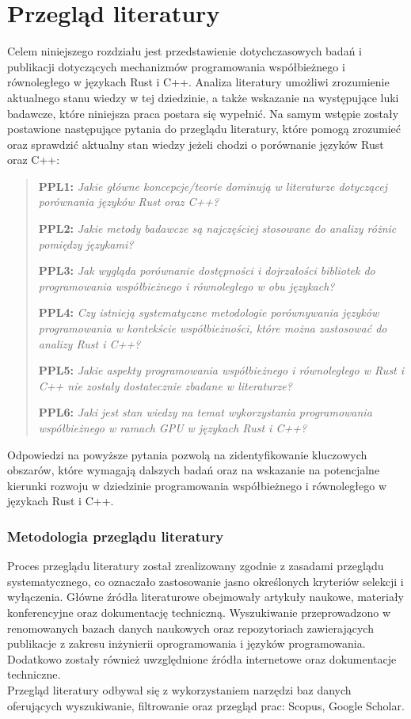 \chapter{Przegląd literatury}
Celem niniejszego rozdziału jest przedstawienie dotychczasowych badań i publikacji dotyczących mechanizmów programowania współbieżnego i równoległego w językach Rust i C++. Analiza literatury umożliwi zrozumienie aktualnego stanu wiedzy w tej dziedzinie, a także wskazanie na występujące luki badawcze, które niniejsza praca postara się wypełnić.
Na samym wstępie zostały postawione następujące pytania do przeglądu literatury, które pomogą zrozumieć oraz sprawdzić aktualny stan wiedzy jeżeli chodzi o porównanie języków Rust oraz C++:

\begin{quote}
    \item \textbf{PPL1:} \emph{Jakie główne koncepcje/teorie dominują w literaturze dotyczącej porównania języków Rust oraz C++?} \label{PPL1}
    \item \textbf{PPL2:} \emph{Jakie metody badawcze są najczęściej stosowane do analizy różnic pomiędzy językami?}
    \item \textbf{PPL3:} \emph{Jak wygląda porównanie dostępności i dojrzałości bibliotek do programowania współbieżnego i równoległego w obu językach?}
    \item \textbf{PPL4:} \emph{Czy istnieją systematyczne metodologie porównywania języków programowania w kontekście współbieżności, które można zastosować do analizy Rust i C++?}
    \item \textbf{PPL5:} \emph{Jakie aspekty programowania współbieżnego i równoległego w Rust i C++ nie zostały dostatecznie zbadane w literaturze?}
    \item \textbf{PPL6:} \emph{Jaki jest stan wiedzy na temat wykorzystania programowania współbieżnego w ramach GPU w językach Rust i C++?}
\end{quote}

Odpowiedzi na powyższe pytania pozwolą na zidentyfikowanie kluczowych obszarów, które wymagają dalszych badań oraz na wskazanie na potencjalne kierunki rozwoju w dziedzinie programowania współbieżnego i równoległego w językach Rust i C++.\\
\subsection{Metodologia przeglądu literatury}
Proces przeglądu literatury został zrealizowany zgodnie z zasadami przeglądu systematycznego, co oznaczało zastosowanie jasno określonych kryteriów selekcji i wyłączenia. Główne źródła literaturowe obejmowały artykuły naukowe, materiały konferencyjne oraz dokumentację techniczną. Wyszukiwanie przeprowadzono w renomowanych bazach danych naukowych oraz repozytoriach zawierających publikacje z zakresu inżynierii oprogramowania i języków programowania. Dodatkowo zostały również uwzględnione źródła internetowe oraz dokumentacje techniczne.\\
Przegląd literatury odbywał się z wykorzystaniem narzędzi baz danych oferujących wyszukiwanie, filtrowanie oraz przegląd prac: Scopus, Google Scholar.\\

